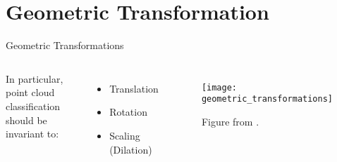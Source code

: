 \section{Geometric Transformation}
\begin{frame}[c]{Geometric Transformations}
    \large
    \begin{columns}
        In particular, point cloud classification should be invariant to:
        \begin{itemize}
            \item Translation
            \item Rotation
            \item Scaling (Dilation)
        \end{itemize}
        \centering
        \begin{figure}
            \texttt{[image: geometric\_transformations]}
            \caption{Figure from \cite{BibEntry2019Oct}.}
        \end{figure}
    \end{columns}
\end{frame}


